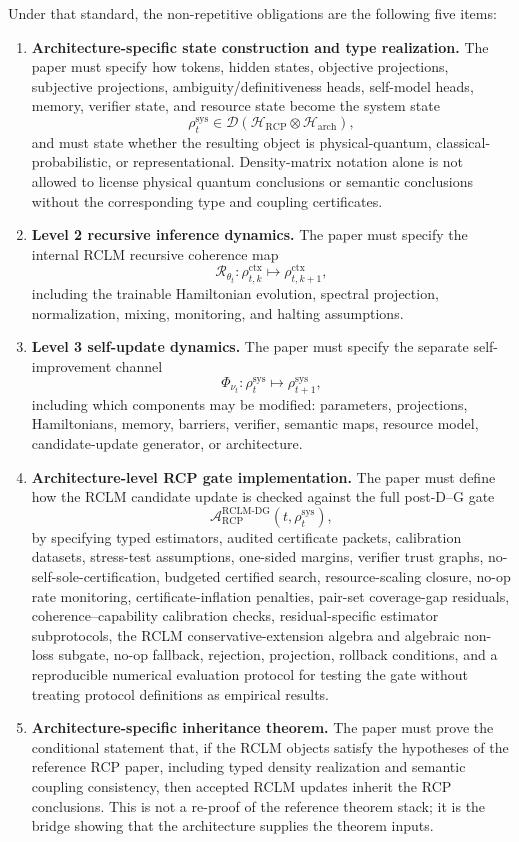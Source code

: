 \documentclass[11pt,a4paper]{article}
\newcommand{\D}{\mathcal D}
\newcommand{\Hcal}{\mathcal H}
\newcommand{\Acal}{\mathcal A}
\newcommand{\Rcal}{\mathcal R}
\newcommand{\RCP}{\mathrm{RCP}}
\newcommand{\RCLM}{\mathrm{RCLM}}
\newcommand{\DG}{\mathrm{DG}}
\newcommand{\sys}{\mathrm{sys}}
\newcommand{\ctx}{\mathrm{ctx}}
\newcommand{\arch}{\mathrm{arch}}
\begin{document}
Under that standard, the non-repetitive obligations are the following five items:
\begin{enumerate}[label=(\arabic*),leftmargin=1.5em]
    \item \textbf{Architecture-specific state construction and type realization.} The paper must specify how tokens, hidden states, objective projections, subjective projections, ambiguity/definitiveness heads, self-model heads, memory, verifier state, and resource state become the system state
    \[
    \rho_t^{\sys}\in\D(\Hcal_{\RCP}\otimes\Hcal_{\arch}),
    \]
    and must state whether the resulting object is physical-quantum, classical-probabilistic, or representational. Density-matrix notation alone is not allowed to license physical quantum conclusions or semantic conclusions without the corresponding type and coupling certificates.
    \item \textbf{Level 2 recursive inference dynamics.} The paper must specify the internal RCLM recursive coherence map
    \[
    \Rcal_{\theta_t}:\rho_{t,k}^{\ctx}\mapsto\rho_{t,k+1}^{\ctx},
    \]
    including the trainable Hamiltonian evolution, spectral projection, normalization, mixing, monitoring, and halting assumptions.
    \item \textbf{Level 3 self-update dynamics.} The paper must specify the separate self-improvement channel
    \[
    \Phi_{\nu_t}:\rho_t^{\sys}\mapsto\rho_{t+1}^{\sys},
    \]
    including which components may be modified: parameters, projections, Hamiltonians, memory, barriers, verifier, semantic maps, resource model, candidate-update generator, or architecture.
    \item \textbf{Architecture-level RCP gate implementation.} The paper must define how the RCLM candidate update is checked against the full post-D--G gate
    \[
    \Acal_{\RCP}^{\RCLM\text{-}\DG}(t,\rho_t^{\sys}),
    \]
    by specifying typed estimators, audited certificate packets, calibration datasets, stress-test assumptions, one-sided margins, verifier trust graphs, no-self-sole-certification, budgeted certified search, resource-scaling closure, no-op rate monitoring, certificate-inflation penalties, pair-set coverage-gap residuals, coherence--capability calibration checks, residual-specific estimator subprotocols, the RCLM conservative-extension algebra and algebraic non-loss subgate, no-op fallback, rejection, projection, rollback conditions, and a reproducible numerical evaluation protocol for testing the gate without treating protocol definitions as empirical results.
    \item \textbf{Architecture-specific inheritance theorem.} The paper must prove the conditional statement that, if the RCLM objects satisfy the hypotheses of the reference RCP paper, including typed density realization and semantic coupling consistency, then accepted RCLM updates inherit the RCP conclusions. This is not a re-proof of the reference theorem stack; it is the bridge showing that the architecture supplies the theorem inputs.
\end{enumerate}
\end{document}
